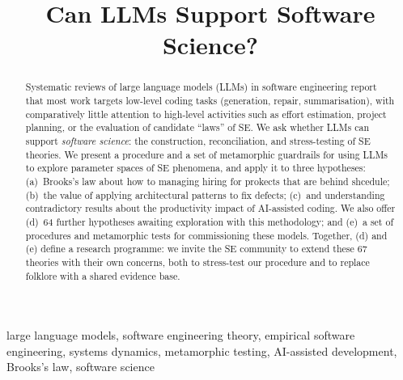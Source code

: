 \documentclass[10pt,conference]{IEEEtran}
\begin{document}
\title{Can LLMs Support Software Science?}
\author{
}
\maketitle
\begin{abstract}
Systematic reviews of large language models (LLMs) in software
engineering report that most work targets low-level coding tasks
(generation, repair, summarisation), with comparatively little
attention to high-level activities such as effort estimation,
project planning, or the evaluation of candidate ``laws'' of SE.
We ask whether LLMs can support \emph{software science}: the
construction, reconciliation, and stress-testing of SE theories.
We present a procedure and a set of metamorphic guardrails for
using LLMs to explore parameter spaces of SE phenomena, and apply
  it to three hypotheses: (a)~Brooks's law about how to managing hiring
  for prokects that are behind shcedule;
  (b)~the value of applying architectural patterns to 
  fix defects; (c)~and understanding contradictory results
  about 
the productivity impact of AI-assisted coding. 
  We also offer (d)~64 further hypotheses awaiting exploration with
  this methodology; and (e)~a set of procedures and metamorphic
  tests for commissioning these models. Together, (d) and (e)
  define a research programme: we invite the SE community to extend
  these 67 theories with their own concerns, both to stress-test our
  procedure and to replace folklore with a shared evidence base.
  \end{abstract}
\begin{IEEEkeywords}
large language models, software engineering theory, empirical
software engineering, systems dynamics, metamorphic testing, AI-assisted development,
Brooks's law, software science
\end{IEEEkeywords}
\IEEEpeerreviewmaketitle
\end{document}
